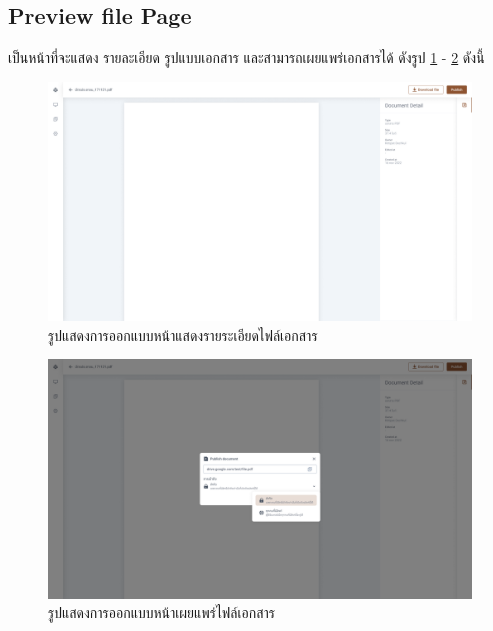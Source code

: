 \documentclass[12pt,oneside,openright,a4paper]{cpe-thai-project}
\begin{document}
\subsection{Preview file Page}
\hspace*{1cm} เป็นหน้าที่จะแสดง รายละเอียด รูปแบบเอกสาร และสามารถเผยแพร่เอกสารได้ ดังรูป \ref{fig:preview-file} - \ref{fig:public-document} ดังนี้
\begin{figure}[!h]\centering
  \includegraphics[width=13cm]{./assets/userinterface/preview-file.png}
  \caption{รูปแสดงการออกแบบหน้าแสดงรายระเอียดไฟล์เอกสาร}\label{fig:preview-file}
\end{figure}

\begin{figure}[!h]\centering
  \includegraphics[width=13cm]{./assets/userinterface/public-document.png}
  \caption{รูปแสดงการออกแบบหน้าเผยแพร่ไฟล์เอกสาร}\label{fig:public-document}
\end{figure}

\newpage
\end{document}
